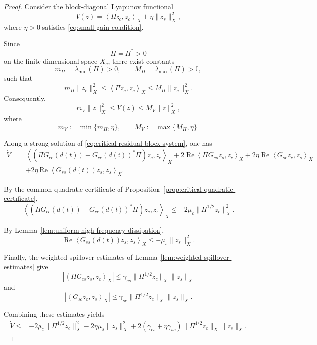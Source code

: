 \documentclass[pdflatex,sn-mathphys-num]{sn-jnl}
\theoremstyle{thmstyleone}%
\theoremstyle{thmstyletwo}%
\theoremstyle{thmstylethree}%
\begin{document}
\begin{proof}

Consider the block-diagonal Lyapunov functional
\begin{equation}
V(z)
=
\left\langle
\Pi z_c,
z_c
\right\rangle_X
+
\eta\|z_s\|_X^2,
\label{eq:coupled-Lyapunov}
\end{equation}
where \(\eta>0\) satisfies
\eqref{eq:small-gain-condition}.

Since
\[
\Pi=\Pi^*>0
\]
on the finite-dimensional space \(X_c\), there exist constants
\[
m_\Pi
=
\lambda_{\min}(\Pi)>0,
\qquad
M_\Pi
=
\lambda_{\max}(\Pi)>0,
\]
such that
\[
m_\Pi\|z_c\|_X^2
\le
\left\langle
\Pi z_c,
z_c
\right\rangle_X
\le
M_\Pi\|z_c\|_X^2.
\]
Consequently,
\begin{equation}
m_V\|z\|_X^2
\le
V(z)
\le
M_V\|z\|_X^2,
\label{eq:Lyapunov-equivalence}
\end{equation}
where
\[
m_V:=\min\{m_\Pi,\eta\},
\qquad
M_V:=\max\{M_\Pi,\eta\}.
\]

Along a strong solution of
\eqref{eq:critical-residual-block-system}, one has
\[
\begin{aligned}
\dot V
={}&
\left\langle
\left(
\Pi G_{cc}(d(t))
+
G_{cc}(d(t))^*\Pi
\right)z_c,
z_c
\right\rangle_X
+
2\operatorname{Re}
\left\langle
\Pi G_{cs}z_s,
z_c
\right\rangle_X
+
2\eta\operatorname{Re}
\left\langle
G_{sc}z_c,
z_s
\right\rangle_X
\\
&+
2\eta\operatorname{Re}
\left\langle
G_{ss}(d(t))z_s,
z_s
\right\rangle_X .
\end{aligned}
\]

By the common quadratic certificate of Proposition~\ref{prop:critical-quadratic-certificate},
\[
\left\langle
\left(
\Pi G_{cc}(d(t))
+
G_{cc}(d(t))^*\Pi
\right)z_c,
z_c
\right\rangle_X
\le
-2\mu_c
\|\Pi^{1/2}z_c\|_X^2.
\]

By Lemma~\ref{lem:uniform-high-frequency-dissipation},
\[
\operatorname{Re}
\left\langle
G_{ss}(d(t))z_s,
z_s
\right\rangle_X
\le
-\mu_s\|z_s\|_X^2.
\]

Finally, the weighted spillover estimates of Lemma~\ref{lem:weighted-spillover-estimates}
give
\[
\left|
\left\langle
\Pi G_{cs}z_s,
z_c
\right\rangle_X
\right|
\le
\gamma_{cs}
\|\Pi^{1/2}z_c\|_X
\|z_s\|_X
\]
and
\[
\left|
\left\langle
G_{sc}z_c,
z_s
\right\rangle_X
\right|
\le
\gamma_{sc}
\|\Pi^{1/2}z_c\|_X
\|z_s\|_X.
\]

Combining these estimates yields
\begin{equation}
\begin{aligned}
\dot V
\le{}&
-2\mu_c
\|\Pi^{1/2}z_c\|_X^2
-
2\eta\mu_s
\|z_s\|_X^2
+
2\left(
\gamma_{cs}
+
\eta\gamma_{sc}
\right)
\|\Pi^{1/2}z_c\|_X
\|z_s\|_X.
\end{aligned}
\label{eq:coupled-Lyapunov-derivative}
\end{equation}


\end{proof}
\end{document}
